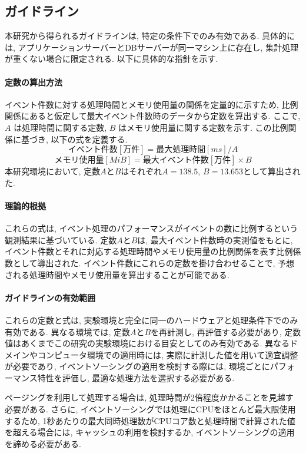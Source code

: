\documentclass[../../main]{subfiles}
\begin{document}
    \subsection{ガイドライン}\label{subsec:consideration-guideline}

    本研究から得られるガイドラインは, 特定の条件下でのみ有効である. 具体的には, アプリケーションサーバーとDBサーバーが同一マシン上に存在し, 集計処理が重くない場合に限定される. 以下に具体的な指針を示す.

    \paragraph{定数の算出方法}
    イベント件数に対する処理時間とメモリ使用量の関係を定量的に示すため, 比例関係にあると仮定して最大イベント件数時のデータから定数を算出する. ここで, \(A\) は処理時間に関する定数, \(B\) はメモリ使用量に関する定数を示す. この比例関係に基づき, 以下の式を定義する.
    \[ イベント件数[万件] = 最大処理時間[ms] / A \]
    \[ メモリ使用量[MiB] = 最大イベント件数[万件] \times B \]
    本研究環境において, 定数\(A\)と\(B\)はそれぞれ\(A = 138.5\), \(B = 13.653\)として算出された.

    \paragraph{理論的根拠}
    これらの式は, イベント処理のパフォーマンスがイベントの数に比例するという観測結果に基づいている. 定数\(A\)と\(B\)は, 最大イベント件数時の実測値をもとに, イベント件数とそれに対応する処理時間やメモリ使用量の比例関係を表す比例係数として導出された. イベント件数にこれらの定数を掛け合わせることで, 予想される処理時間やメモリ使用量を算出することが可能である.

    \paragraph{ガイドラインの有効範囲}
    これらの定数と式は, 実験環境と完全に同一のハードウェアと処理条件下でのみ有効である. 異なる環境では, 定数\(A\)と\(B\)を再計測し, 再評価する必要があり, 定数値はあくまでこの研究の実験環境における目安としてのみ有効である. 異なるドメインやコンピュータ環境での適用時には, 実際に計測した値を用いて適宜調整が必要であり, イベントソーシングの適用を検討する際には, 環境ごとにパフォーマンス特性を評価し, 最適な処理方法を選択する必要がある.

    ページングを利用して処理する場合は, 処理時間が2倍程度かかることを見越す必要がある. さらに, イベントソーシングでは処理にCPUをほとんど最大限使用するため, 1秒あたりの最大同時処理数がCPUコア数と処理時間で計算された値を超える場合には, キャッシュの利用を検討するか, イベントソーシングの適用を諦める必要がある.

    \clearpage
\end{document}
